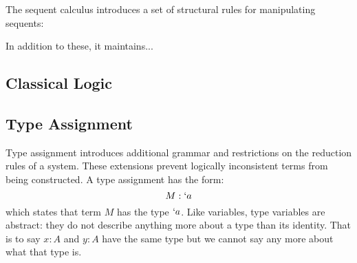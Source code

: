   The sequent calculus introduces a set of structural rules for manipulating sequents:
  
  In addition to these, it maintains...
  
  \subsection{Classical Logic}
  
  
 

  \subsection{Type Assignment}
  
  Type assignment introduces additional grammar and restrictions on
  the reduction rules of a system. These extensions prevent logically
  inconsistent terms from being constructed. A type assignment has the
  form:
  \[
    M : `a 
  \]
  which states that term $M$ has the type $`a$. Like variables, type 
  variables are abstract: they do not describe anything more about a 
  type than its identity. That is to say $x: A$ and $y : A$ have the
  same type but we cannot say any more about what that type is.
 
